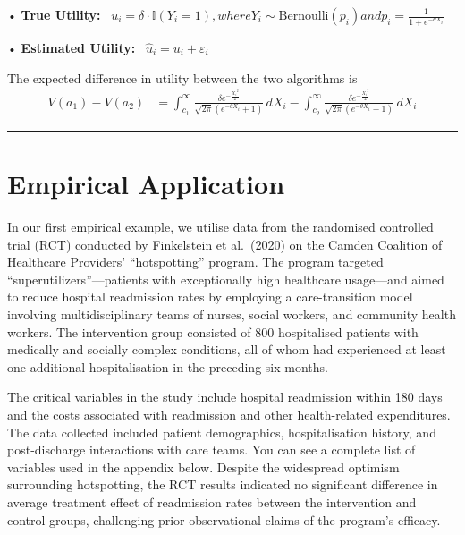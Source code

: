 \documentclass[
]{article}
\begin{document}
• \textbf{True Utility:}~
\(u_i = \delta \cdot \mathbb{I}(Y_i = 1) , where  Y_i \sim \text{Bernoulli}(p_i)  and  p_i = \frac{1}{1 + e^{-\theta X_i}}\)

• \textbf{Estimated Utility:}~ \(\hat{u}_i = u_i + \varepsilon_i\)

The expected difference in utility between the two algorithms is \[
\begin{aligned}
V(a_{1})- V(a_{2}) &= \int_{c_{1}}^\infty \frac{\delta  e^{-\frac{{X_i}^2}{2}}}{\sqrt{2 \pi } \left(e^{-\theta X_{i}}+1\right)}\, dX_{i} - \int_{c_{2}}^\infty \frac{\delta  e^{-\frac{{X_i}^2}{2}}}{\sqrt{2 \pi } \left(e^{-\theta X_{i}}+1\right)}\, dX_{i} 
\end{aligned}
\]

\begin{center}\rule{0.5\linewidth}{0.5pt}\end{center}

\section{Empirical Application}\label{empirical-application}

In our first empirical example, we utilise data from the randomised
controlled trial (RCT) conducted by Finkelstein et al.~(2020) on the
Camden Coalition of Healthcare Providers' ``hotspotting'' program. The
program targeted ``superutilizers''---patients with exceptionally high
healthcare usage---and aimed to reduce hospital readmission rates by
employing a care-transition model involving multidisciplinary teams of
nurses, social workers, and community health workers. The intervention
group consisted of 800 hospitalised patients with medically and socially
complex conditions, all of whom had experienced at least one additional
hospitalisation in the preceding six months.

The critical variables in the study include hospital readmission within
180 days and the costs associated with readmission and other
health-related expenditures. The data collected included patient
demographics, hospitalisation history, and post-discharge interactions
with care teams. You can see a complete list of variables used in the
appendix below. Despite the widespread optimism surrounding hotspotting,
the RCT results indicated no significant difference in average treatment
effect of readmission rates between the intervention and control groups,
challenging prior observational claims of the program's efficacy.
\end{document}
